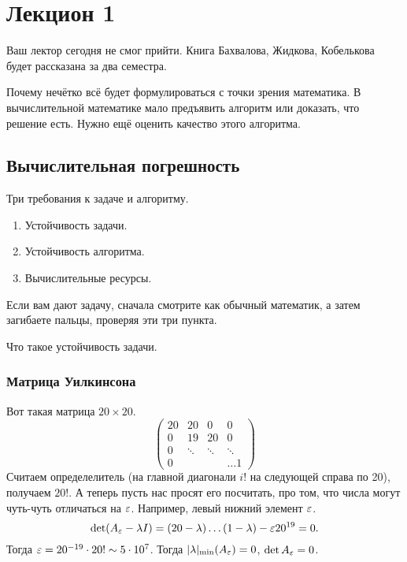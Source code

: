\section{Лекцион 1}


Ваш лектор сегодня не смог прийти. Книга Бахвалова, Жидкова, Кобелькова будет рассказана за два семестра. 

Почему нечётко всё будет формулироваться с точки зрения математика. В вычислительной математике мало предъявить алгоритм или доказать, что решение есть. Нужно ещё оценить качество этого алгоритма.
\subsection{Вычислительная погрешность}
Три требования к задаче и алгоритму.
\begin{enumerate}
\item Устойчивость задачи.
\item Устойчивость алгоритма.
\item Вычислительные ресурсы.
\end{enumerate}
Если вам дают задачу, сначала смотрите как обычный математик, а затем загибаете пальцы, проверяя эти три пункта.

Что такое устойчивость задачи.

\subsubsection{Матрица Уилкинсона}
Вот такая матрица $20\times20$.
\[
  \begin{pmatrix}
  20 & 20 & 0  & 0\\
  0  & 19 & 20 & 0\\
  0 & \ddots & \ddots & \ddots\\
  0 & &&\dots 1
\end{pmatrix}
\]
Считаем определелитель (на главной диагонали $i!$ на следующей справа по 20), получаем $20!$. А теперь пусть нас просят его посчитать, про том, что числа могут чуть-чуть отличаться на $\varepsilon$. Например, левый нижний элемент $\varepsilon$.
\[
  \det (A_\varepsilon - \lambda I) = (20 - \lambda)\dots (1-\lambda) - \varepsilon 20^{19} = 0.
\]
Тогда $\varepsilon = 20^{-19}\cdot 20!\sim 5 \cdot 10^7$. Тогда $|\lambda|_{\min}(A_\varepsilon) = 0$, $\det A_\varepsilon =0$.

